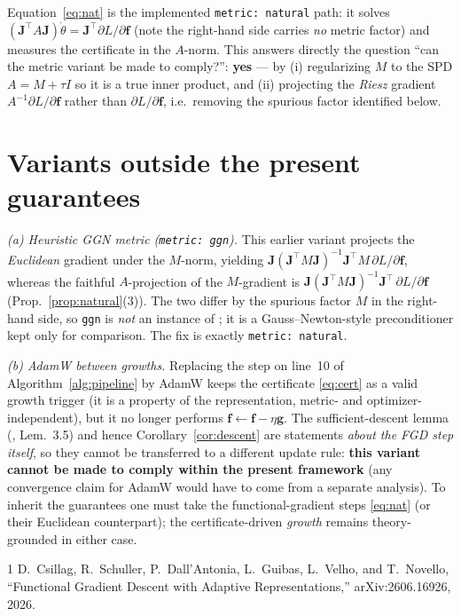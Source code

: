 \documentclass[conference]{IEEEtran}
\theoremstyle{remark}
\newcommand{\J}{\mathbf{J}}
\newcommand{\f}{\bm{f}}
\newcommand{\g}{\bm{g}}
\newcommand{\transpose}{^{\!\top}}
\begin{document}
Equation~\eqref{eq:nat} is the implemented \texttt{metric: natural} path: it solves
$(\J\transpose A\J)\dot\theta=\J\transpose\partial L/\partial\f$ (note the
right-hand side carries \emph{no} metric factor) and measures the certificate in
the $A$-norm. This answers directly the question ``can the metric variant be made
to comply?'': \textbf{yes} --- by (i) regularizing $M$ to the SPD $A=M+\tau I$ so
it is a true inner product, and (ii) projecting the \emph{Riesz} gradient
$A^{-1}\partial L/\partial\f$ rather than $\partial L/\partial\f$, i.e.\ removing
the spurious factor identified below.

\section{Variants outside the present guarantees}
\emph{(a) Heuristic GGN metric (\texttt{metric: ggn}).} This earlier variant
projects the \emph{Euclidean} gradient under the $M$-norm, yielding
$\J(\J\transpose M\J)^{-1}\J\transpose M\,\partial L/\partial\f$, whereas the
faithful $A$-projection of the $M$-gradient is
$\J(\J\transpose M\J)^{-1}\J\transpose\,\partial L/\partial\f$ (Prop.~\ref{prop:natural}(3)).
The two differ by the spurious factor $M$ in the right-hand side, so
\texttt{ggn} is \emph{not} an instance of \cite{fgd}; it is a Gauss--Newton-style
preconditioner kept only for comparison. The fix is exactly
\texttt{metric: natural}.

\emph{(b) AdamW between growths.} Replacing the step on line~10 of
Algorithm~\ref{alg:pipeline} by AdamW keeps the certificate \eqref{eq:cert} as a
valid growth trigger (it is a property of the representation, metric- and
optimizer-independent), but it no longer performs $\f\gets\f-\eta\g$. The
sufficient-descent lemma (\cite{fgd}, Lem.~3.5) and hence
Corollary~\ref{cor:descent} are statements \emph{about the FGD step itself}, so
they cannot be transferred to a different update rule: \textbf{this variant cannot
be made to comply within the present framework} (any convergence claim for AdamW
would have to come from a separate analysis). To inherit the guarantees one must
take the functional-gradient steps \eqref{eq:nat} (or their Euclidean
counterpart); the certificate-driven \emph{growth} remains theory-grounded in
either case.

\begin{thebibliography}{1}
D.~Csillag, R.~Schuller, P.~Dall'Antonia, L.~Guibas, L.~Velho, and T.~Novello,
``Functional Gradient Descent with Adaptive Representations,''
arXiv:2606.16926, 2026.
\end{thebibliography}
\end{document}
